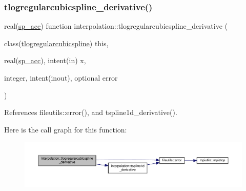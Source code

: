 \mbox{\label{namespaceinterpolation_ac23315fe4c5bc33742774f63869508b4}} 
\subsubsection{\texorpdfstring{tlogregularcubicspline\+\_\+derivative()}{tlogregularcubicspline\_derivative()}}
{\footnotesize\ttfamily real(\mbox{\hyperlink{namespaceinterpolation_af72aa9a05feb8ef90b2d26e4a013abf3}{sp\+\_\+acc}}) function interpolation\+::tlogregularcubicspline\+\_\+derivative (\begin{DoxyParamCaption}\item[{class(\mbox{\hyperlink{structinterpolation_1_1tlogregularcubicspline}{tlogregularcubicspline}})}]{this,  }\item[{real(\mbox{\hyperlink{namespaceinterpolation_af72aa9a05feb8ef90b2d26e4a013abf3}{sp\+\_\+acc}}), intent(in)}]{x,  }\item[{integer, intent(inout), optional}]{error }\end{DoxyParamCaption})}



References fileutils\+::error(), and tspline1d\+\_\+derivative().

Here is the call graph for this function\+:
\nopagebreak
\begin{figure}[H]
\begin{center}
\leavevmode
\includegraphics[width=350pt]{namespaceinterpolation_ac23315fe4c5bc33742774f63869508b4_cgraph}
\end{center}
\end{figure}
\mbox{\label{namespaceinterpolation_aa2be88d51742c20455f21df95d3cb51d}} 
